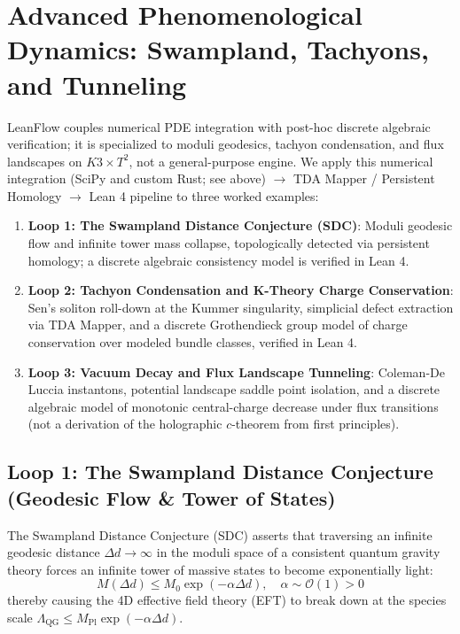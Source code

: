 \documentclass[11pt,a4paper]{article}
\begin{document}
\section{Advanced Phenomenological Dynamics: Swampland, Tachyons, and Tunneling}
\label{sec:advanced_pheno_dynamics}
LeanFlow couples numerical PDE integration with post-hoc discrete algebraic verification; it is specialized to moduli geodesics, tachyon condensation, and flux landscapes on $K3 \times T^2$, not a general-purpose engine. We apply this numerical integration (SciPy and custom Rust; see above) $\to$ TDA Mapper / Persistent Homology $\to$ Lean 4 pipeline to three worked examples:
\begin{enumerate}
    \item \textbf{Loop 1: The Swampland Distance Conjecture (SDC)}: Moduli geodesic flow and infinite tower mass collapse, topologically detected via persistent homology; a discrete algebraic consistency model is verified in Lean 4.
    \item \textbf{Loop 2: Tachyon Condensation and K-Theory Charge Conservation}: Sen's soliton roll-down at the Kummer singularity, simplicial defect extraction via TDA Mapper, and a discrete Grothendieck group model of charge conservation over modeled bundle classes, verified in Lean 4.
    \item \textbf{Loop 3: Vacuum Decay and Flux Landscape Tunneling}: Coleman-De Luccia instantons, potential landscape saddle point isolation, and a discrete algebraic model of monotonic central-charge decrease under flux transitions (not a derivation of the holographic $c$-theorem from first principles).
\end{enumerate}

\subsection{Loop 1: The Swampland Distance Conjecture (Geodesic Flow \& Tower of States)}
The Swampland Distance Conjecture (SDC) \cite{ooguri2006} asserts that traversing an infinite geodesic distance $\Delta d \to \infty$ in the moduli space of a consistent quantum gravity theory forces an infinite tower of massive states to become exponentially light:
\begin{equation}
M(\Delta d) \le M_0 \exp(-\alpha \Delta d), \quad \alpha \sim \mathcal{O}(1) > 0
\end{equation}
thereby causing the 4D effective field theory (EFT) to break down at the species scale $\Lambda_{\text{QG}} \le M_{\text{Pl}} \exp(-\alpha \Delta d)$.
\end{document}
